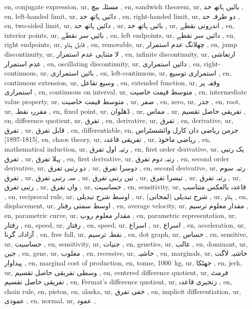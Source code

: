 en, conjugate expression,
ur, مسئلہ بیچ ,
en, sandwich theorem,
ur, بائیں ہاتھ حد ,
en, left-handed limit,
ur, دائیں ہاتھ حد ,
en, right-handed limit,
ur, دو طرفہ حد ,
en, two-sided limit,
ur, دائیں ہاتھ حد ,
ur, بائیں ہاتھ حد ,
ur, اندرونی نقطے ,
en, interior points,
ur, بائیں سر نقطے ,
en, left endpoints,
ur, دائیں سر نقطے ,
en, right endpoints,
ur, قابل ہٹاو ,
en, removable,
ur, چھلانگ عدم استمرار ,
en, jump discontinuity,
ur, لا متناہی عدم استمرار ,
en, infinite discontinuity,
ur, ارتعاشی عدم استمرار ,
en, oscillating discontinuity,
ur, دائیں استمراری ,
en, right-continuous,
ur, بائیں استمراری ,
en, left-continuous,
ur, استمراری توسیع ,
en, continuous extension,
ur, وسیع تفاعل ,
en, extended function,
ur, وقفہ پر استمراری ,
en, continuous on interval,
ur, متوسط قیمت خاصیت ,
en, intermediate value property,
ur, متوسط قیمت خاصیت ,
ur, صفر ,
en, zero,
ur, جذر ,
en, root,
ur, مقررہ نقطہ ,
en, fixed point,
ur, ڈھلوان ,
ur, مماس ,
ur, تفریقی حاصل تقسیم ,
en, difference quotient,
ur, تفرق ,
en, derivative,
ur, تفرق ,
en, derivative,
ur, تفرق ,
ur, قابل تفرق ,
en, differentiable,
en, جرمن ریاضی دان کارل وائشسٹراس [1815-1897],
en, chaos theory,
ur, تفریقی قاعدہ ,
ur, ریاضی ماخوذ ,
en, mathematical induction,
ur, رتبہ اول تفرق ,
en, first order derivative,
ur, یک رتبی تفرق ,
ur, پہلا تفرق ,
en, first derivative,
ur, رتبہ دوم تفرق ,
en, second order derivative,
ur, دو رتبی تفرق ,
ur, دوسرا تفرق ,
en, second derivative,
ur, رتبہ سوم تفرق ,
ur, سہ رتبی تفرق ,
ur, تین رتبی تفرق ,
ur, تیسرا تفرق ,
ur, رتبہ  تفرق ,
ur,  رتبی تفرق ,
ur,  واں تفرق ,
ur, حساسیت ,
en, sensitivity,
ur, قاعدہ بالعکس متناسب ,
en, reciprocal rule,
ur, اوسط شرح تبدیلی ,
ur, (لمحاتی) شرح تبدیلی ,
ur, ہٹاو ,
en, displacement,
ur, اوسط سمتی رفتار ,
en, average velocity,
ur, مقدار معلوم ترسیم ,
en, parametric curve,
ur, مقدار معلوم روپ ,
en, parametric representation,
ur, رفتار ,
en, speed,
ur, رفتار ,
en, speed,
ur, اسراع ,
ur, اسراع ,
en, acceleration,
ur, آزادانہ گرنا ,
en, free fall,
ur, نقطہ ترسیم ,
en, dot graph,
ur, حساس ,
en, sensitive,
ur, حساسیت ,
en, sensitivity,
ur, جنیات ,
en, genetics,
ur, غالب ,
en, dominant,
ur, جین ,
en, gene,
ur, مغلوب ,
en, recessive,
ur, حاشیہ ,
en, marginals,
ur, حاشیہ لاگت پیداوار ,
en, marginal cost of production,
en, tonne, \SI {1000}{\kilo \gram },
ur, جھٹکا ,
en, jerk,
ur, وسطی تفریقی حاصل تقسیم ,
en, centered difference quotient,
ur, فرمٹ تفریقی حاصل تقسیم ,
en, Fermat's difference quotient,
ur, زنجیری قاعدہ ,
en, chain rule,
en, piston,
en, alaska,
ur, خفی تفرق ,
en, implicit differentiation,
ur, عمودی ,
en, normal,
ur, عمود ,
